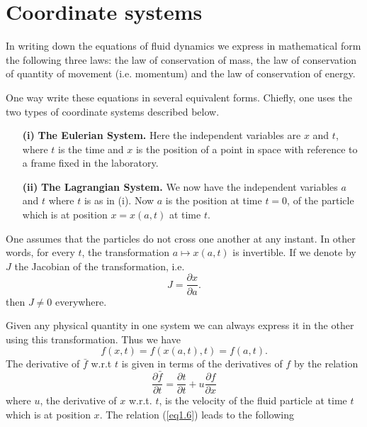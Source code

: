 \section{Coordinate systems}\label{chap1:sec1.3}

In writing down the equations of fluid dynamics we express in
mathematical form the following three laws: the law of conservation of
mass, the law of conservation of quantity of movement (i.e. momentum)
and the law of conservation of energy.

One way write these equations in several equivalent forms. Chiefly,
one uses the two types of coordinate systems described below.
\begin{itemize}
\item[{\rm {\bf(i)}}] {\bf The Eulerian System.} Here the independent
  variables are $x$ and $t$, where $t$ is the time and $x$ is the
  position of a point in space with reference to a frame fixed in the
  laboratory. 

\item[{\rm {\bf(ii)}}] {\bf The Lagrangian System.} We now have the
  independent variables $a$ and $t$ where $t$ is as in (i). Now $a$ is
  the position at time $t = 0$, of the particle which is at position
  $x = x(a,t)$ at time $t$.
\end{itemize}

One assumes that the particles do not cross one another at any
instant. In other words, for every $t$, the transformation $a \mapsto
x(a,t)$ is invertible. If  we denote by $J$ the Jacobian of the
transformation, i.e.
\begin{equation*}
J = \frac{\partial x}{ \partial a}. \tag{1.4}\label{eq1.4}
\end{equation*}
then $J \neq 0$ everywhere.

Given any physical quantity in one system we can always express it in
the other using this transformation. Thus we have 
\begin{equation*}
f(x,t) = f(x(a,t),t) = f(a,t). \tag{1.5}\label{eq1.5}
\end{equation*}\pageoriginale 
The derivative of $\bar{f}$ w.r.t $t$ is given in terms of the
derivatives of $f$ by the relation 
\begin{equation*}
\frac{\partial \bar{f}}{\partial t} = \frac{\partial t}{\partial t} +
u \frac{\partial f}{\partial x} \tag{1.6}\label{eq1.6}
\end{equation*}
where $u$, the derivative of $x$ w.r.t. $t$, is the velocity of the
fluid particle at time $t$ which is at position $x$. The relation
(\ref{eq1.6}) leads to the following 

